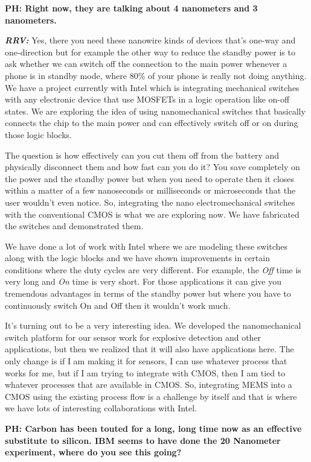 \begin{multicols}{2}
\textbf{PH: Right now, they are talking about 4 nanometers and 3 nanometers.}

\textbf{\textit{RRV:}} Yes, there you need these nanowire kinds of devices that’s one-way and one-direction but for example the other way to reduce the standby power is to ask whether we can switch off the connection to the main power whenever a phone is in standby mode, where 80\% of your phone is really not doing anything. We have a project currently with Intel which is integrating mechanical switches with any electronic device that use MOSFETs in a logic operation like on-off states. We are exploring the idea of using nanomechanical switches that basically connects the chip to the main power and can effectively switch off or on during those logic blocks.

The question is how effectively can you cut them off from the battery and physically disconnect them and how fast can you do it?  You save completely on the power and the standby power but when you need to operate then it closes within a matter of a few nanoseconds or milliseconds or microseconds that the user wouldn’t even notice. So, integrating the nano electromechanical switches with the conventional CMOS is what we are exploring now. We have fabricated the switches and demonstrated them.

We have done a lot of work with Intel where we are modeling these switches along with the logic blocks and we have shown improvements in certain conditions where the duty cycles are very different. For example, the \textit{Off} time is very long and \textit{On} time is very short. For those applications it can give you tremendous advantages in terms of the standby power but where you have to continuously switch On and Off then it wouldn’t work much.

It’s turning out to be a very interesting idea. We developed the nanomechanical switch platform for our sensor work for explosive detection and other applications, but then we realized that it will also have applications here. The only change is if I am making it for sensors, I can use whatever process that works for me, but if I am trying to integrate with CMOS, then I am tied to whatever processes that are available in CMOS. So, integrating MEMS into a CMOS using the existing process flow is a challenge by itself and that is where we have lots of interesting collaborations with Intel.

\textbf{PH: Carbon has been touted for a long, long time now as an effective substitute to silicon. IBM seems to have done the 20 Nanometer experiment, where do you see this going?}


\end{multicols}
